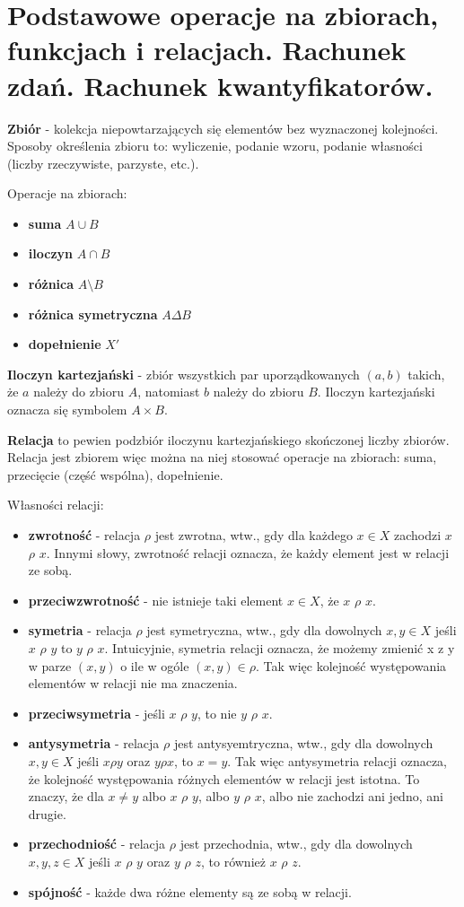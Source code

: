 \documentclass[../main.tex]{subfiles}
\begin{document}
\section{Podstawowe operacje na zbiorach, funkcjach i relacjach. Rachunek zdań. Rachunek kwantyfikatorów.}

\textbf{Zbiór} - kolekcja niepowtarzających się elementów bez wyznaczonej kolejności. Sposoby określenia zbioru to: wyliczenie, podanie wzoru, podanie własności (liczby rzeczywiste, parzyste, etc.).

Operacje na zbiorach:
\begin{itemize}
    \item \textbf{suma} $A \cup B$
    \item \textbf{iloczyn} $A \cap B$
    \item \textbf{różnica} $A \setminus B$
    \item \textbf{różnica symetryczna} $A \Delta B$
    \item \textbf{dopełnienie} $X'$
\end{itemize}

\textbf{Iloczyn kartezjański} - zbiór wszystkich par uporządkowanych $(a, b)$ takich, że $a$ należy do zbioru $A$, natomiast $b$ należy do zbioru $B$. Iloczyn kartezjański oznacza się symbolem $A \times B$.

\textbf{Relacja} to pewien podzbiór iloczynu kartezjańskiego skończonej liczby zbiorów. Relacja jest zbiorem więc można na niej stosować operacje na zbiorach: suma, przecięcie (część wspólna), dopełnienie.

Własności relacji:
\begin{itemize}
    \item \textbf{zwrotność} - relacja $\rho$ jest zwrotna, wtw., gdy dla każdego $x \in X$ zachodzi $x$ $\rho$ $x$. Innymi słowy, zwrotność relacji oznacza, że każdy element jest w relacji ze sobą.
    \item \textbf{przeciwzwrotność} - nie istnieje taki element $x \in X$, że $x$ $\rho$ $x$.
    \item \textbf{symetria} - relacja $\rho$ jest symetryczna, wtw., gdy dla dowolnych $x, y \in X$ jeśli $x$ $\rho$ $y$ to $y$ $\rho$ $x$. Intuicyjnie, symetria relacji oznacza, że możemy zmienić x z y w parze $(x,y)$ o ile w ogóle $(x,y) \in \rho$. Tak więc kolejność występowania elementów w relacji nie ma znaczenia.
    \item \textbf{przeciwsymetria} - jeśli $x$ $\rho$ $y$, to nie $y$ $\rho$ $x$.
    \item \textbf{antysymetria} - relacja $\rho$ jest antysyemtryczna, wtw., gdy dla dowolnych $x,y \in X$ jeśli $x \rho y$ oraz $y \rho x$, to $x = y$. Tak więc antysymetria relacji oznacza, że kolejność występowania różnych elementów w relacji jest istotna. To znaczy, że dla $x \neq y$ albo $x$ $\rho$ $y$, albo $y$ $\rho$ $x$, albo nie zachodzi ani jedno, ani drugie.
    \item \textbf{przechodniość} - relacja $\rho$ jest przechodnia, wtw., gdy dla dowolnych $x,y,z \in X$ jeśli $x$ $\rho$ $y$ oraz $y$ $\rho$ $z$, to również $x$ $\rho$ $z$.
    \item \textbf{spójność} - każde dwa różne elementy są ze sobą w relacji.
\end{itemize}
\end{document}
